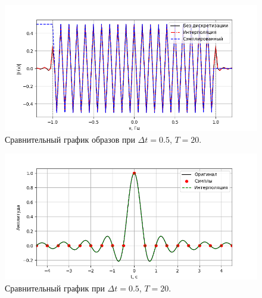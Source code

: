 \documentclass[a4paper]{article}
\begin{document}
\begin{figure}[H]
  \centering
  \includegraphics[width=\textwidth]{src/task_2/2_freq_20_0.5.png}
  \caption{Сравнительный график образов при $\Delta t=0.5$, $T=20$.} 
\end{figure}
\begin{figure}[H]
  \centering
  \includegraphics[width=\textwidth]{src/task_2/2_time_20_0.5.png}
  \caption{Сравнительный график при $\Delta t=0.5$, $T=20$.} 
\end{figure}
\end{document}
